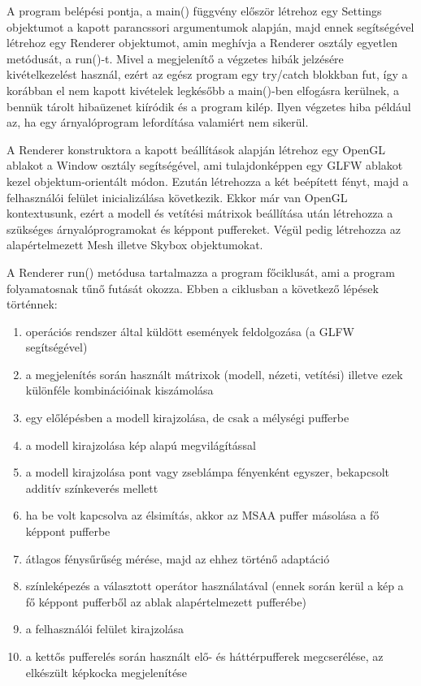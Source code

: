 A program belépési pontja, a main() függvény először létrehoz egy Settings objektumot a kapott parancssori argumentumok alapján, majd ennek segítségével létrehoz egy Renderer objektumot, amin meghívja a Renderer osztály egyetlen metódusát, a run()-t. Mivel a megjelenítő a végzetes hibák jelzésére kivételkezelést használ, ezért az egész program egy try/catch blokkban fut, így a korábban el nem kapott kivételek legkésőbb a main()-ben elfogásra kerülnek, a bennük tárolt hibaüzenet kiíródik és a program kilép. Ilyen végzetes hiba például az, ha egy árnyalóprogram lefordítása valamiért nem sikerül.

A Renderer konstruktora a kapott beállítások alapján létrehoz egy OpenGL ablakot a Window osztály segítségével, ami tulajdonképpen egy GLFW ablakot kezel objektum-orientált módon. Ezután létrehozza a két beépített fényt, majd a felhasználói felület inicializálása következik. Ekkor már van OpenGL kontextusunk, ezért a modell és vetítési mátrixok beállítása után létrehozza a szükséges árnyalóprogramokat és képpont puffereket. Végül pedig létrehozza az alapértelmezett Mesh illetve Skybox objektumokat.

A Renderer run() metódusa tartalmazza a program főciklusát, ami a program folyamatosnak tűnő futását okozza. Ebben a ciklusban a következő lépések történnek:

\begin{enumerate}
  \item operációs rendszer által küldött események feldolgozása (a GLFW segítségével)
  \item a megjelenítés során használt mátrixok (modell, nézeti, vetítési) illetve ezek különféle kombinációinak kiszámolása
  \item egy előlépésben a modell kirajzolása, de csak a mélységi pufferbe
  \item a modell kirajzolása kép alapú megvilágítással
  \item a modell kirajzolása pont vagy zseblámpa fényenként egyszer, bekapcsolt additív színkeverés mellett
  \item ha be volt kapcsolva az élsimítás, akkor az MSAA puffer másolása a fő képpont pufferbe
  \item átlagos fénysűrűség mérése, majd az ehhez történő adaptáció
  \item színleképezés a választott operátor használatával (ennek során kerül a kép a fő képpont pufferből az ablak alapértelmezett pufferébe)
  \item a felhasználói felület kirajzolása
  \item a kettős pufferelés során használt elő- és háttérpufferek megcserélése, az elkészült képkocka megjelenítése
\end{enumerate}

